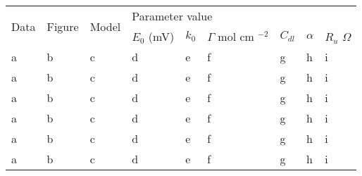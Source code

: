 \begin{table}[]
\begin{tabular}{|l|l|l|llllll|}
\hline
\multirow{2}{*}{Data} & \multirow{2}{*}{Figure} & \multirow{2}{*}{Model} & \multicolumn{6}{l|}{Parameter value}                                                                                                                                                         \\ \cline{4-9} 
                        &                         &                        & \multicolumn{1}{l|}{$E_0$ (mV)} & \multicolumn{1}{l|}{$k_0$} & \multicolumn{1}{l|}{$\Gamma$ mol cm $^{-2}$} & \multicolumn{1}{l|}{$C_{dl}$} & \multicolumn{1}{l|}{$\alpha$} & $R_u$ $\Omega$ \\ \hline
a                     & b                       & c                      & \multicolumn{1}{l|}{d}          & \multicolumn{1}{l|}{e}     & \multicolumn{1}{l|}{f}                       & \multicolumn{1}{l|}{g}        & \multicolumn{1}{l|}{h}        & i              \\ \hline
a                     & b                       & c                      & \multicolumn{1}{l|}{d}          & \multicolumn{1}{l|}{e}     & \multicolumn{1}{l|}{f}                       & \multicolumn{1}{l|}{g}        & \multicolumn{1}{l|}{h}        & i              \\ \hline
a                     & b                       & c                      & \multicolumn{1}{l|}{d}          & \multicolumn{1}{l|}{e}     & \multicolumn{1}{l|}{f}                       & \multicolumn{1}{l|}{g}        & \multicolumn{1}{l|}{h}        & i              \\ \hline
a                     & b                       & c                      & \multicolumn{1}{l|}{d}          & \multicolumn{1}{l|}{e}     & \multicolumn{1}{l|}{f}                       & \multicolumn{1}{l|}{g}        & \multicolumn{1}{l|}{h}        & i              \\ \hline
a                     & b                       & c                      & \multicolumn{1}{l|}{d}          & \multicolumn{1}{l|}{e}     & \multicolumn{1}{l|}{f}                       & \multicolumn{1}{l|}{g}        & \multicolumn{1}{l|}{h}        & i              \\ \hline
a                     & b                       & c                      & \multicolumn{1}{l|}{d}          & \multicolumn{1}{l|}{e}     & \multicolumn{1}{l|}{f}                       & \multicolumn{1}{l|}{g}        & \multicolumn{1}{l|}{h}        & i              \\ \hline

\end{tabular}
\end{table}
